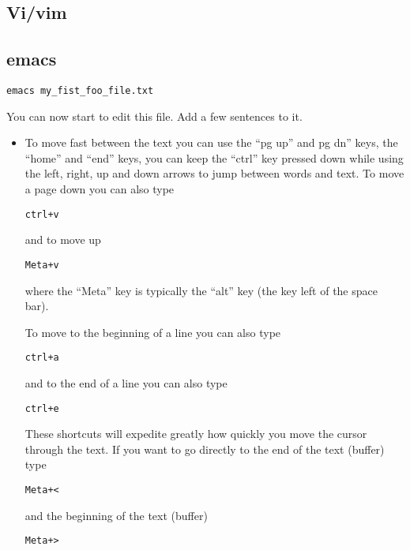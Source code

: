\documentclass[aps,showpacs,prd,notitlepage,preprintnumbers,amsmath,amssymb,letterpaper]{revtex4}
\begin{document}
\subsection{Vi/vim}



\subsection{emacs}
\begin{verbatim}
emacs my_fist_foo_file.txt
\end{verbatim}

You can now start to edit this file. Add a few sentences to it.
\begin{itemize}

\item To move fast between the text you can use the ``pg up'' and pg
  dn'' keys, the ``home'' and ``end'' keys, you can keep the ``ctrl''
  key pressed down while using the left, right, up and down arrows to jump
  between words and text. To move a page down you can also type

\begin{verbatim}
ctrl+v
\end{verbatim}

and to move up

\begin{verbatim}
Meta+v
\end{verbatim}

where the ``Meta'' key is typically the ``alt'' key (the key left of the space bar).

To move to the beginning of a line you can also type
\begin{verbatim}
ctrl+a
\end{verbatim}

and to the end of a line you can also type
\begin{verbatim}
ctrl+e
\end{verbatim}


These shortcuts will expedite greatly how quickly you move the cursor
through the text. If you want to go directly to the end of the text (buffer)
type

\begin{verbatim}
Meta+<
\end{verbatim}

and the beginning of the text (buffer)

\begin{verbatim}
Meta+>
\end{verbatim}


\end{itemize}
\end{document}
